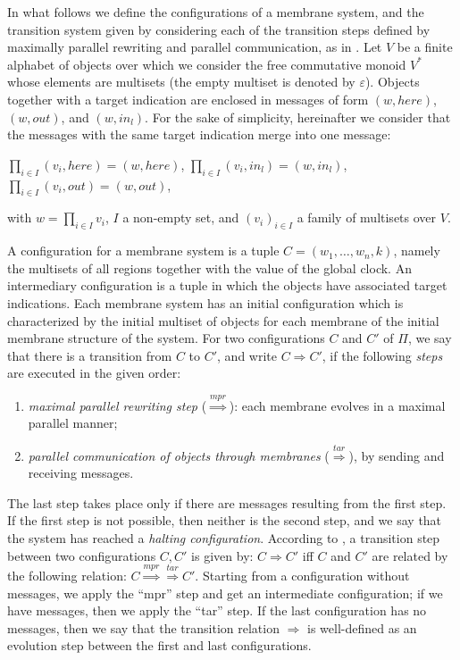 \documentclass{eptcs}
\begin{document}
In what follows we define the configurations of a membrane system,
and the transition system given by considering each of the
transition steps defined by maximally parallel rewriting and
parallel communication, as in \cite{CiobanuHandbook}. Let $V$ be a
finite alphabet of objects over which we consider the free
commutative monoid $V^*$ whose elements are multisets (the empty
multiset is denoted by $\varepsilon$). Objects together with a target indication
are enclosed in messages of form $(w, here)$, $(w, out)$, and
$(w, in_l )$. For the sake of simplicity, hereinafter we consider
that the messages with the same target indication merge into one
message:

\centerline{$\displaystyle \prod_{i\in I} (v_i,here)=(w,here)$,
$\displaystyle \prod_{i\in I} (v_i,in_l)=(w,in_l)$, $\displaystyle
\prod_{i\in I} (v_i,out)=(w,out)$,}

\noindent
with $w=\displaystyle \prod_{i\in I} v_i$, $I$ a non-empty
set, and $(v_i)_{i\in I}$ a family of multisets over $V$.

A configuration for a membrane system is a tuple
$C=(w_1,\ldots,w_n,k)$, namely the multisets of all regions together
with the value of the global clock. An intermediary configuration is
a tuple in which the objects have associated target indications.
Each membrane system has an initial configuration which is
characterized by the initial multiset of objects for each membrane
of the initial membrane structure of the system.
For two configurations $C$ and $C'$ of $\Pi$, we say that there is a
transition from $C$ to $C'$, and write $C\Rightarrow C'$, if the
following {\it steps} are executed in the given order:
\begin{enumerate}
\item {\em maximal parallel rewriting step}
($\stackrel{mpr}{\Longrightarrow}$):
each membrane evolves in a maximal parallel manner;
\item {\em parallel communication of objects through membranes}
($\stackrel{tar}{\Longrightarrow}$), by sending and receiving messages.
\end{enumerate}
The last step takes place only if there are messages resulting from
the first step. If the first step is not possible, then neither is
the second step, and we say that the system has reached a {\em halting
configuration}. According to \cite{Andrei07}, a transition step
between two configurations $C,C'$ is given by: $C \Rightarrow C'$
iff $C$ and $C'$ are related by the following relation: $C
\stackrel{mpr}{\Longrightarrow} \stackrel{tar}{\Longrightarrow}C'$.
Starting from a configuration without messages, we apply the ``mpr''
step and get an intermediate configuration; if we have messages,
then we apply the ``tar'' step. If the last configuration has no
messages, then we say that the transition relation $\Rightarrow$ is
well-defined as an evolution step between the first and last
configurations.
\end{document}
